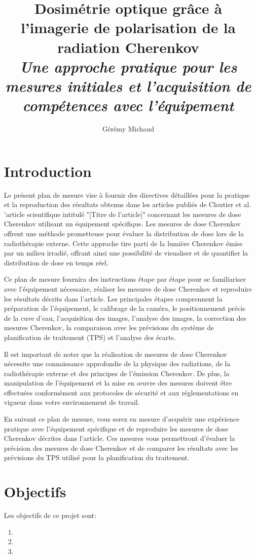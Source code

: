 \documentclass{Thesis}
\title{Dosimétrie optique grâce à l'imagerie de polarisation de la radiation Cherenkov
\\\Large{\textit{Une approche pratique pour les mesures initiales et l'acquisition de compétences avec l'équipement}}}
\author{Gérémy Michaud}{G. Michaud}
\begin{document}
\section*{Introduction}
Le présent plan de mesure vise à fournir des directives détaillées pour la pratique
et la reproduction des résultats obtenus dans les articles publiés de Cloutier et al. \cite{cloutier_direct_2022} 'article scientifique intitulé "[Titre de l'article]" concernant les mesures de dose Cherenkov utilisant un équipement spécifique. Les mesures de dose Cherenkov offrent une méthode prometteuse pour évaluer la distribution de dose lors de la radiothérapie externe. Cette approche tire parti de la lumière Cherenkov émise par un milieu irradié, offrant ainsi une possibilité de visualiser et de quantifier la distribution de dose en temps réel.

Ce plan de mesure fournira des instructions étape par étape pour se familiariser avec l'équipement nécessaire, réaliser les mesures de dose Cherenkov et reproduire les résultats décrits dans l'article. Les principales étapes comprennent la préparation de l'équipement, le calibrage de la caméra, le positionnement précis de la cuve d'eau, l'acquisition des images, l'analyse des images, la correction des mesures Cherenkov, la comparaison avec les prévisions du système de planification de traitement (TPS) et l'analyse des écarts.

Il est important de noter que la réalisation de mesures de dose Cherenkov nécessite une connaissance approfondie de la physique des radiations, de la radiothérapie externe et des principes de l'émission Cherenkov. De plus, la manipulation de l'équipement et la mise en œuvre des mesures doivent être effectuées conformément aux protocoles de sécurité et aux réglementations en vigueur dans votre environnement de travail.

En suivant ce plan de mesure, vous serez en mesure d'acquérir une expérience pratique avec l'équipement spécifique et de reproduire les mesures de dose Cherenkov décrites dans l'article. Ces mesures vous permettront d'évaluer la précision des mesures de dose Cherenkov et de comparer les résultats avec les prévisions du TPS utilisé pour la planification du traitement.
\section*{Objectifs}
Les objectifs de ce projet sont:
\begin{enumerate}
    \setlength\itemsep{1mm}
    \item 
    \item 
    \item 
\end{enumerate}
\end{document}
